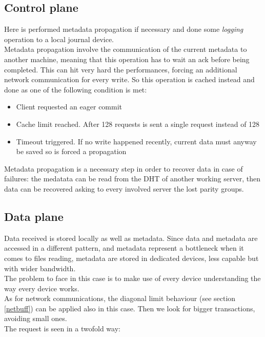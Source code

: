 \subsection{Control plane}
Here is performed metadata propagation if necessary and done some
\textit{logging} operation to a local journal device. \\ Metadata propagation
involve the communication of the current metadata to another machine, meaning
that this operation has to wait an ack before being completed.  This can hit
very hard the performances, forcing an additional network communication for
every write. So this operation is cached instead and done as one of the
following condition is met:
\begin{itemize}
    \item Client requested an eager commit
    \item Cache limit reached. After 128 requests is sent a single request
        instead of 128
    \item Timeout triggered. If no write happened recently, current
        data must anyway be saved so is forced a propagation
\end{itemize}
Metadata propagation is a necessary step in order to recover data in case of
failures: the medatata can be read from the DHT of another working server, then
data can be recovered asking to every involved server the lost parity groups.

\subsection{Data plane}
Data received is stored locally as well as metadata. Since data and metadata
are accessed in a different pattern, and metadata represent a bottleneck when
it comes to files reading, metadata are stored in dedicated devices, less
capable but with wider bandwidth. \\
The problem to face in this case is to make use of every device understanding
the way every device works. \\
As for network communications, the diagonal limit behaviour (see section
\ref{netbuff}) can be applied also in this case. Then we look for bigger
transactions, avoiding small ones. \\
The request is seen in a twofold way: \\

